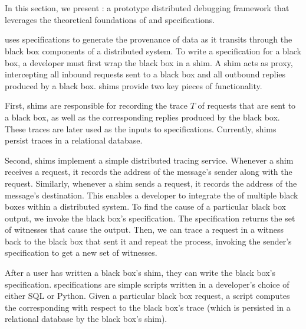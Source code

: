 \section{\fluent{}}
In this section, we present \fluent{}: a prototype distributed debugging
framework that leverages the theoretical foundations of \watprovenance{} and
\watprovenance{} specifications.

\fluent{} uses \watprovenance{} specifications to generate the provenance of
data as it transits through the black box components of a distributed system.
To write a \watprovenance{} specification for a black box, a developer must
first wrap the black box in a \fluent{} shim. A shim acts as proxy,
intercepting all inbound requests sent to a black box and all outbound replies
produced by a black box. \fluent{} shims provide two key pieces of
functionality.

First, \fluent{} shims are responsible for recording the trace $T$ of requests
that are sent to a black box, as well as the corresponding replies produced by
the black box. These traces are later used as the inputs to \watprovenance{}
specifications.  Currently, \fluent{} shims persist traces in a relational
database.

Second, \fluent{} shims implement a simple distributed tracing service.
Whenever a \fluent{} shim receives a request, it records the address of the
message's sender along with the request. Similarly, whenever a \fluent{}
shim sends a request, it records the address of the message's
destination.
%
This enables a developer to integrate the \watprovenance{} of multiple black
boxes within a distributed system. To find the cause of a particular black box
output, we invoke the black box's \watprovenance{} specification.  The
specification returns the set of witnesses that cause the output. Then, we can
trace a request in a witness back to the black box that sent it and repeat the
process, invoking the sender's \watprovenance{} specification to get a new set
of witnesses.

After a user has written a black box's shim, they can write the black box's
\watprovenance{} specification. \fluent{} \watprovenance{} specifications are
simple scripts written in a developer's choice of either SQL or Python. Given a
particular black box request, a \watprovenance{}  script computes the
corresponding \watprovenance{} with respect to the black box's trace (which is
persisted in a relational database by the black box's shim).
